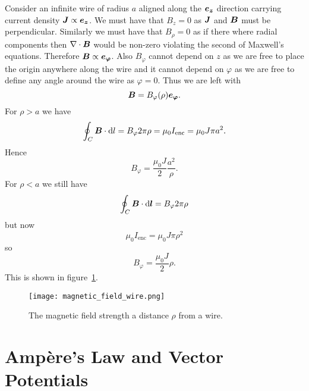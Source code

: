     \begin{example}\label{exa:infinite wire magnetic field}
        Consider an infinite wire of radius \(a\) aligned along the \(\bm{e_{z}}\) direction carrying current density \(\bm{J}\propto\bm{e_{z}}\).
        We must have that \(B_z = 0\) as \(\bm{J}\) and \(\bm{B}\) must be perpendicular.
        Similarly we must have that \(B_\rho = 0\) as if there where radial components then \(\nabla\cdot\bm{B}\) would be non-zero violating the second of Maxwell's equations.
        Therefore \(\bm{B}\propto\bm{e_{\varphi}}\).
        Also \(B_\varphi\) cannot depend on \(z\) as we are free to place the origin anywhere along the wire and it cannot depend on \(\varphi\) as we are free to define any angle around the wire as \(\varphi = 0\).
        Thus we are left with
        \[\bm{B} = B_\varphi(\rho)\bm{e_{\varphi}}.\]
        For \(\rho > a\) we have
        \[\oint_C \bm{B}\cdot\dd{l} = B_\varphi 2\pi\rho = \mu_0 I_{\mathrm{enc}} = \mu_0 J\pi a^2.\]
        Hence
        \[B_\varphi = \frac{\mu_0 J}{2} \frac{a^2}{\rho}.\]
        For \(\rho < a\) we still have
        \[\oint_C \bm{B}\cdot\dd{\bm{l}} = B_\varphi 2\pi\rho\]
        but now
        \[\mu_0I_{\mathrm{enc}} = \mu_0J\pi\rho^2\]
        so
        \[B_\varphi = \frac{\mu_0J}{2}\rho.\]
        This is shown in figure~\ref{fig:magnetic field strength wire}.
        \begin{figure}[ht]
            \centering
            \texttt{[image: magnetic\_field\_wire.png]}
            \caption{The magnetic field strength a distance \(\rho\) from a wire.}
            \label{fig:magnetic field strength wire}
        \end{figure}
    \end{example}

    \section{Amp\`ere's Law and Vector Potentials}
